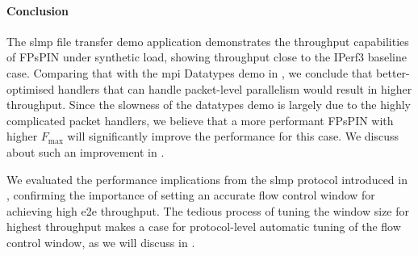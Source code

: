 \paragraph{Conclusion} The \ac{slmp} file transfer demo application demonstrates the throughput capabilities of FPsPIN under synthetic load, showing throughput close to the IPerf3 baseline case.  Comparing that with the \ac{mpi} Datatypes demo in , we conclude that better-optimised handlers that can handle packet-level parallelism would result in higher throughput.  Since the slowness of the datatypes demo is largely due to the highly complicated packet handlers, we believe that a more performant FPsPIN with higher $F_\text{max}$ will significantly improve the performance for this case.  We discuss about such an improvement in .

We evaluated the performance implications from the \ac{slmp} protocol introduced in , confirming the importance of setting an accurate flow control window for achieving high \ac{e2e} throughput.  The tedious process of tuning the window size for highest throughput makes a case for protocol-level automatic tuning of the flow control window, as we will discuss in .
